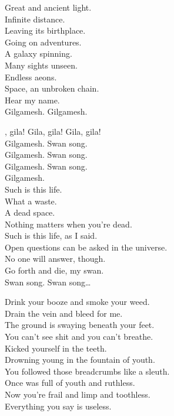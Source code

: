 Great and ancient light. \\
Infinite distance. \\
Leaving its birthplace. \\
Going on adventures. \\
A galaxy spinning. \\
Many sights unseen. \\
Endless aeons. \\
Space, an unbroken chain. \\
Hear my name. \\

Gilgamesh. Gilgamesh. \\


, gila! Gila, gila! Gila, gila! \\

Gilgamesh. Swan song. \\
Gilgamesh. Swan song. \\
Gilgamesh. Swan song. \\

Gilgamesh. \\

Such is this life. \\
What a waste. \\
A dead space. \\
Nothing matters when you're dead. \\
Such is this life, as I said. \\
Open questions can be asked in the universe. \\
No one will answer, though. \\
Go forth and die, my swan. \\

Swan song. Swan song… \\



Drink your booze and smoke your weed. \\
Drain the vein and bleed for me. \\
The ground is swaying beneath your feet. \\
You can't see shit and you can't breathe. \\
Kicked yourself in the teeth. \\
Drowning young in the fountain of youth. \\
You followed those breadcrumbs like a sleuth. \\
Once was full of youth and ruthless. \\
Now you're frail and limp and toothless. \\
Everything you say is useless. \\

